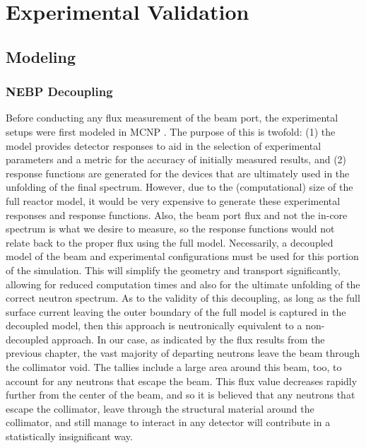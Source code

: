 
\cleardoublepage


\chapter{Experimental Validation}


\section{Modeling}

\subsection{NEBP Decoupling}

Before conducting any flux measurement of the beam port, the experimental setups were first modeled in MCNP \cite{goorley2012initial}.
The purpose of this is twofold: (1) the model provides detector responses to aid in the selection of experimental parameters and a metric for the accuracy of initially measured results, and (2) response functions are generated for the devices that are ultimately used in the unfolding of the final spectrum.
However, due to the (computational) size of the full reactor model, it would be very expensive to generate these experimental responses and response functions.
Also, the beam port flux and not the in-core spectrum is what we desire to measure, so the response functions would not relate back to the proper flux using the full model.
Necessarily, a decoupled model of the beam and experimental configurations must be used for this portion of the simulation.
This will simplify the geometry and transport significantly, allowing for reduced computation times and also for the ultimate unfolding of the correct neutron spectrum.
As to the validity of this decoupling, as long as the full surface current leaving the outer boundary of the full model is captured in the decoupled model, then this approach is neutronically equivalent to a non-decoupled approach.
In our case, as indicated by the flux results from the previous chapter, the vast majority of departing neutrons leave the beam through the collimator void.
The tallies include a large area around this beam, too, to account for any neutrons that escape the beam.
This flux value decreases rapidly further from the center of the beam, and so it is believed that any neutrons that escape the collimator, leave through the structural material around the collimator, and still manage to interact in any detector will contribute in a statistically insignificant way.

